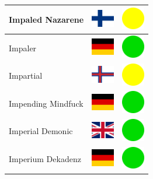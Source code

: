 \documentclass[12pt, a4paper, twoside]{report}
\begin{document}
\begin{center}
\begin{longtable}{|p{5cm}|p{2cm}|p{2cm}|}
 Impaled Nazarene                                           & \includegraphics[width=1cm]{../4x3/fi} &   \includegraphics[width=1cm]{../likes/m} \\ \hline
 Impaler                                                    & \includegraphics[width=1cm]{../4x3/de} &   \includegraphics[width=1cm]{../likes/y} \\ \hline
 Impartial                                                  & \includegraphics[width=1cm]{../4x3/fo} &   \includegraphics[width=1cm]{../likes/m} \\ \hline
 Impending Mindfuck                                         & \includegraphics[width=1cm]{../4x3/de} &   \includegraphics[width=1cm]{../likes/y} \\ \hline
 Imperial Demonic                                           & \includegraphics[width=1cm]{../4x3/gb} &   \includegraphics[width=1cm]{../likes/y} \\ \hline
 Imperium Dekadenz                                          & \includegraphics[width=1cm]{../4x3/de} &   \includegraphics[width=1cm]{../likes/y} \\ \hline

\end{longtable}
\end{center}
\end{document}
